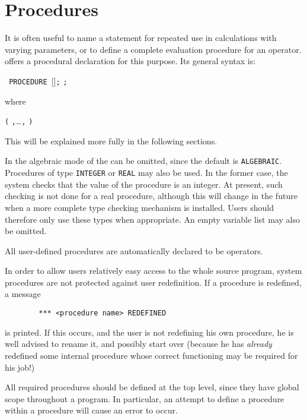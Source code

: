 \chapter{Procedures}
\hypertarget{command:PROCEDURE}{}

It is often useful to name a statement for repeated use in calculations
with varying parameters, or to define a complete evaluation procedure for
an operator. {\REDUCE} offers a procedural declaration for this purpose. Its
general syntax is:
\begin{syntax}
   \texttt{ PROCEDURE }[]\texttt{;}
    \texttt{;}
\end{syntax}
where
\begin{syntax}
    \bnfprod \texttt{(}  \texttt{,}\ldots\texttt{,} \texttt{)}
\end{syntax}
This will be explained more fully in the following sections.

In the algebraic mode of {\REDUCE} the  can be
omitted, since the default is \texttt{ALGEBRAIC}.  Procedures of type 
\texttt{INTEGER} or \texttt{REAL} may also be used.  In the former case, the system
checks that the value of the procedure is an integer.  At present, such
checking is not done for a real procedure, although this will change in
the future when a more complete type checking mechanism is installed.
Users should therefore only use these types when appropriate.  An empty
variable list may also be omitted.

All user-defined procedures are automatically declared to be operators.

In order to allow users relatively easy access to the whole {\REDUCE} source
program, system procedures are not protected against user redefinition. If
a procedure is redefined, a message
\begin{verbatim}
        *** <procedure name> REDEFINED
\end{verbatim}
is printed. If this occurs, and the user is not redefining his own
procedure, he is well advised to rename it, and possibly start over
(because he has {\em already\/} redefined some internal procedure whose correct
functioning may be required for his job!)

All required procedures should be defined at the top level, since they
have global scope throughout a program. In particular, an attempt to
define a procedure within a procedure will cause an error to occur.

